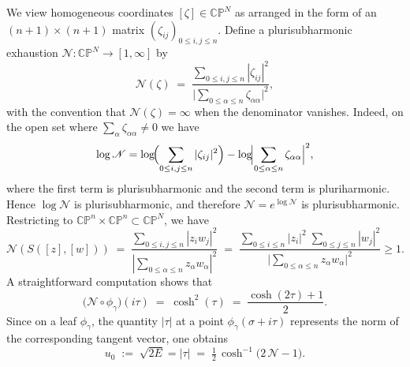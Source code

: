 \documentclass[a4paper, 12pt]{article}
\newcommand{\tCP}{\mathbb{CP}^n\times\mathbb{CP}^n}
\begin{document}
We view homogeneous coordinates $[\zeta]\in \mathbb{CP}^N$ as arranged in the form of an $(n+1)\times(n+1)$ matrix $(\zeta_{ij})_{0\le i,j\le n}$. Define a plurisubharmonic exhaustion $\mathscr{N}:\mathbb{CP}^N \to [1,\infty]$ by
\[
\mathscr{N}(\zeta)
\;=\;
\frac{\sum_{0\le i,j\le n}|\zeta_{ij}|^2}{\bigl|\sum_{0\le\alpha\le n}\zeta_{\alpha\alpha}\bigr|^2},
\]
with the convention that $\mathscr{N}(\zeta)=\infty$ when the denominator vanishes. Indeed, on the open set where $\sum_{\alpha}\zeta_{\alpha\alpha}\neq 0$ we have
\[
\log \mathscr{N}
=
\log\!\Bigl(\sum_{0\le i,j\le n}|\zeta_{ij}|^2\Bigr)
-\log\!\Bigl|\sum_{0\le\alpha\le n}\zeta_{\alpha\alpha}\Bigr|^2,
\]
where the first term is plurisubharmonic and the second term is pluriharmonic. Hence $\log \mathscr{N}$ is plurisubharmonic, and therefore $\mathscr{N}=e^{\log\mathscr{N}}$ is plurisubharmonic. Restricting to \(\tCP \subset \mathbb{CP}^N\), we have
\[
\mathscr{N}(S([z],[w]))
\;=\;
\frac{\sum_{0\leq i,j\leq n}|z_iw_j|^2}{|\sum_{0\leq\alpha\leq n}z_\alpha w_\alpha|^2}
\;=\;
\frac{\sum_{0\le i\le n}|z_i|^2\;\sum_{0\le j\le n}|w_j|^2}{\bigl|\sum_{0\le\alpha\le n}z_{\alpha} w_{\alpha}\bigr|^2}\ge 1.
\]
A straightforward computation shows that
\[
\bigl(\mathscr{N}\circ\phi_{\gamma}\bigr)(i\tau)
\;=\;
\cosh^2(\tau)
\;=\;
\frac{\cosh(2\tau)+1}{2}.
\]
Since on a leaf $\phi_\gamma$, the quantity $|\tau|$ at a point $\phi_\gamma(\sigma+i\tau)$ represents the norm of the corresponding tangent vector, one obtains
\begin{equation}\label{eq-u0}
u_{0} \;:=\; \sqrt{2E}=|\tau|
\;=\;
\tfrac{1}{2}\,\cosh^{-1}\!\bigl(2\,\mathscr{N} - 1\bigr).
\end{equation}
\end{document}
